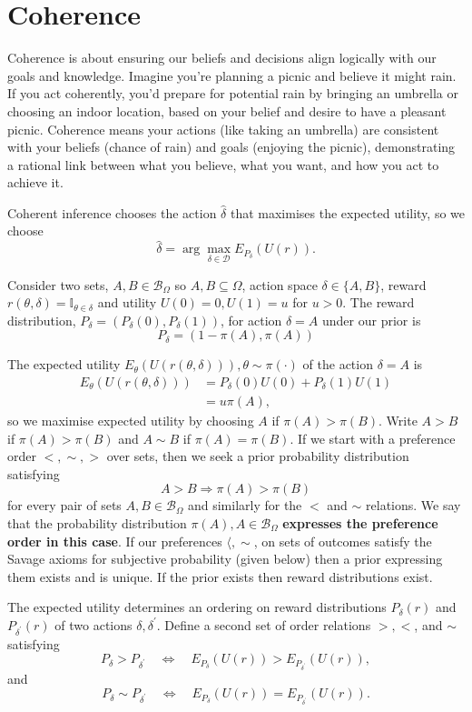 \documentclass{article}
\begin{document}
\section{Coherence}
Coherence is about ensuring our beliefs and decisions align logically with our goals and knowledge. Imagine you're planning a picnic and believe it might rain. If you act coherently, you'd prepare for potential rain by bringing an umbrella or choosing an indoor location, based on your belief and desire to have a pleasant picnic. Coherence means your actions (like taking an umbrella) are consistent with your beliefs (chance of rain) and goals (enjoying the picnic), demonstrating a rational link between what you believe, what you want, and how you act to achieve it.

Coherent inference chooses the action $\hat{\delta}$ that maximises the expected utility, so we choose
$$
\hat{\delta}=\arg \max _{\delta \in \mathcal{D}} E_{P_\delta}(U(r)) .
$$

Consider two sets, $A, B \in \mathcal{B}_{\Omega}$ so $A, B \subseteq \Omega$, action space $\delta \in\{A, B\}$, reward $r(\theta, \delta)=\mathbb{I}_{\theta \in \delta}$ and utility $U(0)=0, U(1)=u$ for $u>0$. The reward distribution, $P_\delta=\left(P_\delta(0), P_\delta(1)\right)$, for action $\delta=A$ under our prior is
$$
P_\delta=(1-\pi(A), \pi(A))
$$

The expected utility $E_\theta(U(r(\theta, \delta))), \theta \sim \pi(\cdot)$ of the action $\delta=A$ is
$$
\begin{aligned}
E_\theta(U(r(\theta, \delta))) & =P_\delta(0) U(0)+P_\delta(1) U(1) \\
& =u \pi(A),
\end{aligned}
$$
so we maximise expected utility by choosing $A$ if $\pi(A)>\pi(B)$.
Write $A>B$ if $\pi(A)>\pi(B)$ and $A \sim B$ if $\pi(A)=\pi(B)$. If we start with a preference order $<, \sim,>$ over sets, then we seek a prior probability distribution satisfying
$$
A>B \Rightarrow \pi(A)>\pi(B)
$$
for every pair of sets $A, B \in \mathcal{B}_{\Omega}$ and similarly for the $<$ and $\sim$ relations. We say that the probability distribution $\pi(A), A \in \mathcal{B}_{\Omega}$ \textbf{expresses the preference order in this case}. If our preferences $\langle, \sim$, on sets of outcomes satisfy the Savage axioms for subjective probability (given below) then a prior expressing them exists and is unique. If the prior exists then reward distributions exist.

The expected utility determines an ordering on reward distributions $P_\delta(r)$ and $P_{\delta^{\prime}}(r)$ of two actions $\delta, \delta^{\prime}$. Define a second set of order relations $>,<$, and $\sim$ satisfying
$$
P_\delta>P_{\delta^{\prime}} \quad \Leftrightarrow \quad E_{P_\delta}(U(r))>E_{P_{\delta^{\prime}}}(U(r)),
$$
and
$$
P_\delta \sim P_{\delta^{\prime}} \quad \Leftrightarrow \quad E_{P_\delta}(U(r))=E_{P_{\delta^{\prime}}}(U(r)) .
$$
\end{document}
